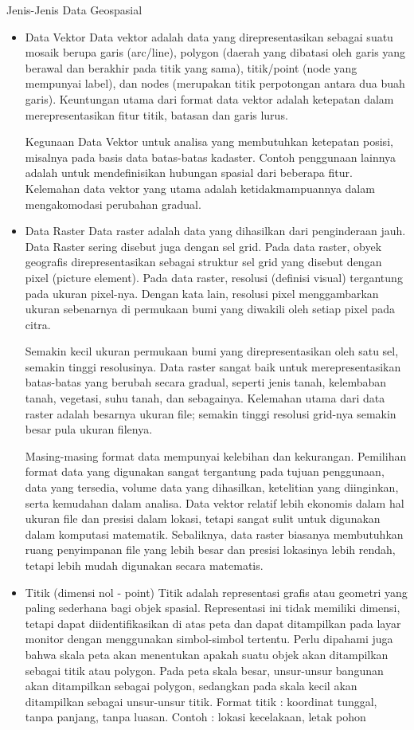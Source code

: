 Jenis-Jenis Data Geospasial
\begin{itemize}
\item Data Vektor
Data vektor adalah data yang direpresentasikan sebagai suatu mosaik berupa garis (arc/line), polygon (daerah yang dibatasi oleh garis yang berawal dan berakhir pada titik yang sama), titik/point (node yang mempunyai label), dan nodes (merupakan titik perpotongan antara dua buah garis). Keuntungan utama dari format data vektor adalah ketepatan dalam merepresentasikan fitur titik, batasan dan garis lurus.

Kegunaan Data Vektor untuk analisa yang membutuhkan ketepatan posisi, misalnya pada basis data batas-batas kadaster. Contoh penggunaan lainnya adalah untuk mendefinisikan hubungan spasial dari beberapa fitur. Kelemahan data vektor yang utama adalah ketidakmampuannya dalam mengakomodasi perubahan gradual.

\item Data Raster
Data raster adalah data yang dihasilkan dari penginderaan jauh. Data Raster sering disebut juga dengan sel grid. Pada data raster, obyek geografis direpresentasikan sebagai struktur sel grid yang disebut dengan pixel (picture element). Pada data raster, resolusi (definisi visual) tergantung pada ukuran pixel-nya. Dengan kata lain, resolusi pixel menggambarkan ukuran sebenarnya di permukaan bumi yang diwakili oleh setiap pixel pada citra.

Semakin kecil ukuran permukaan bumi yang direpresentasikan oleh satu sel, semakin tinggi resolusinya. Data raster sangat baik untuk merepresentasikan batas-batas yang berubah secara gradual, seperti jenis tanah, kelembaban tanah, vegetasi, suhu tanah, dan sebagainya. Kelemahan utama dari data raster adalah besarnya ukuran file; semakin tinggi resolusi grid-nya semakin besar pula ukuran filenya.

Masing-masing format data mempunyai kelebihan dan kekurangan. Pemilihan format data yang digunakan sangat tergantung pada tujuan penggunaan, data yang tersedia, volume data yang dihasilkan, ketelitian yang diinginkan, serta kemudahan dalam analisa. Data vektor relatif lebih ekonomis dalam hal ukuran file dan presisi dalam lokasi, tetapi sangat sulit untuk digunakan dalam komputasi matematik. Sebaliknya, data raster biasanya membutuhkan ruang penyimpanan file yang lebih besar dan presisi lokasinya lebih rendah, tetapi lebih mudah digunakan secara matematis.

\item Titik (dimensi nol - point)
Titik adalah representasi grafis atau geometri yang paling sederhana bagi objek spasial. Representasi ini tidak memiliki dimensi, tetapi dapat diidentifikasikan di atas peta dan dapat ditampilkan pada layar monitor dengan menggunakan simbol-simbol tertentu. Perlu dipahami juga bahwa skala peta akan menentukan apakah suatu objek akan ditampilkan sebagai titik atau polygon. Pada peta skala besar, unsur-unsur bangunan akan ditampilkan sebagai polygon, sedangkan pada skala kecil akan ditampilkan sebagai unsur-unsur titik.
Format titik : koordinat tunggal, tanpa panjang, tanpa luasan.
Contoh : lokasi kecelakaan, letak pohon


\end{itemize}
